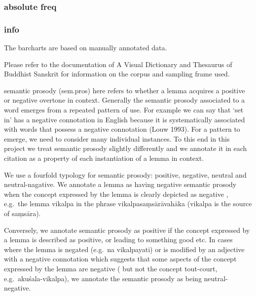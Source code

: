 \documentclass[
  letterpaper,
  DIV=11,
  numbers=noendperiod,
  oneside]{scrreprt}
\begin{document}

\hypertarget{absolute-freq-1}{%
\subsubsection{absolute freq}\label{absolute-freq-1}}

\hypertarget{info-5}{%
\subsubsection{info}\label{info-5}}

The barcharts are based on manually annotated data.

Please refer to the documentation of A Visual Dictionary and Thesaurus
of Buddhist Sanskrit for information on the corpus and sampling frame
used.

semantic prosody (sem.pros) here refers to whether a lemma acquires a
positive or negative overtone in context. Generally the semantic prosody
associated to a word emerges from a repeated pattern of use. For example
we can say that `set in' has a negative connotation in English because
it is systematically associated with words that possess a negative
connotation (Louw 1993). For a pattern to emerge, we need to consider
many individual instances. To this end in this project we treat semantic
prosody slightly differently and we annotate it in each citation as a
property of each instantiation of a lemma in context.

We use a fourfold typology for semantic prosody: positive, negative,
neutral and neutral-nagative. We annotate a lemma as having negative
semantic prosody when the concept expressed by the lemma is clearly
depicted as negative , e.g.~the lemma vikalpa in the phrase
vikalpasaṃsārāvahāka (vikalpa is the source of saṃsāra).

Conversely, we annotate semantic prosody as positive if the concept
expressed by a lemma is described as positive, or leading to something
good etc. In cases where the lemma is negated (e.g.~na vikalpayati) or
is modified by an adjective with a negative connotation which suggests
that some aspects of the concept expressed by the lemma are negative (
but not the concept tout-court, e.g.~akuśala-vikalpa), we annotate the
semantic prosody as being neutral-negative.
\end{document}
